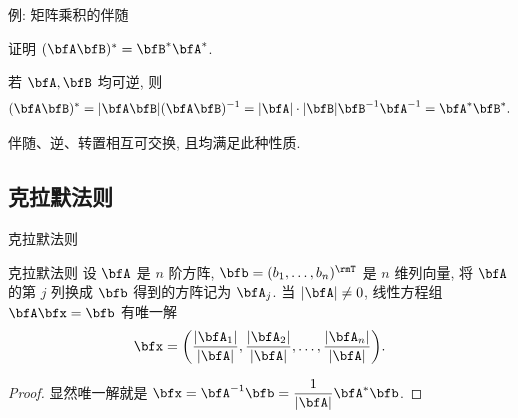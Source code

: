 \begin{frame}{例: 矩阵乘积的伴随}
	\onslide<+->
	\begin{example}
		证明 $(\bfA\bfB)^*=\bfB^*\bfA^*$.
	\end{example}
	\begin{proof*}
		若 $\bfA,\bfB$ 均可逆, 则
		\[(\bfA\bfB)^*=|\bfA\bfB|(\bfA\bfB)^{-1}=|\bfA|\cdot|\bfB|\bfB^{-1}\bfA^{-1}=\bfA^*\bfB^*.\]

		
	\end{proof*}
	\onslide<+->
	\alert{伴随、逆、转置相互可交换, 且均满足此种性质.}
\end{frame}


\subsection{克拉默法则}

\begin{frame}{克拉默法则}
	\onslide<+->
	\begin{second}{克拉默法则}
		设 $\bfA$ 是 $n$ 阶方阵, $\bfb=(b_1,\dots,b_n)^\rmT$ 是 $n$ 维列向量,
		将 $\bfA$ 的第 $j$ 列换成 $\bfb$ 得到的方阵记为 $\bfA_j$.
		当 $|\bfA|\neq 0$, 线性方程组 $\bfA\bfx=\bfb$ 有唯一解
		\[\bfx=\biggl(\frac{|\bfA_1|}{|\bfA|},\frac{|\bfA_2|}{|\bfA|},\dots,\frac{|\bfA_n|}{|\bfA|}\biggr).\]
	\end{second}
	\onslide<+->
	\begin{proof}
		显然唯一解就是 $\bfx=\bfA^{-1}\bfb=\dfrac1{|\bfA|}\bfA^*\bfb$.
		\onslide<+->{%
			因此 $\bfA^*\bfb=(|\bfA_1|,\dots,|\bfA_n|)^\rmT$, 从而 $\bfx$ 具有题述形式.\qedhere
		}
	\end{proof}
\end{frame}


